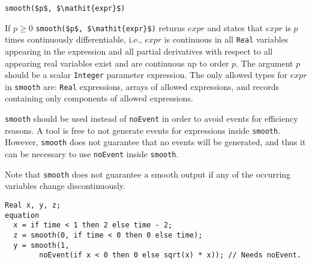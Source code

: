 \begin{operatordefinition}[smooth]
\begin{synopsis}\begin{lstlisting}
smooth($p$, $\mathit{expr}$)
\end{lstlisting}\end{synopsis}
\begin{semantics}
If $p \geq 0$ \lstinline!smooth($p$, $\mathit{expr}$)! returns $\mathit{expr}$ and states that $\mathit{expr}$ is $p$ times continuously differentiable, i.e., $\mathit{expr}$ is continuous in all \lstinline!Real! variables appearing in the expression and all partial derivatives with respect to all appearing real variables exist and are continuous up to order $p$.
The argument $p$ should be a scalar \lstinline!Integer! parameter expression.
The only allowed types for $\mathit{expr}$ in \lstinline!smooth! are: \lstinline!Real! expressions, arrays of allowed expressions, and records containing only components of allowed expressions.

\lstinline!smooth! should be used instead of \lstinline!noEvent! in order to avoid events for efficiency reasons.
A tool is free to not generate events for expressions inside \lstinline!smooth!.
However, \lstinline!smooth! does not guarantee that no events will be generated, and thus it can be necessary to use \lstinline!noEvent! inside \lstinline!smooth!.

\begin{nonnormative}
Note that \lstinline!smooth! does not guarantee a smooth output if any of the occurring variables change discontinuously.
\end{nonnormative}

\begin{example}
\begin{lstlisting}[language=modelica]
  Real x, y, z;
equation
  x = if time < 1 then 2 else time - 2;
  z = smooth(0, if time < 0 then 0 else time);
  y = smooth(1,
        noEvent(if x < 0 then 0 else sqrt(x) * x)); // Needs noEvent.
\end{lstlisting}
\end{example}
\end{semantics}
\end{operatordefinition}

